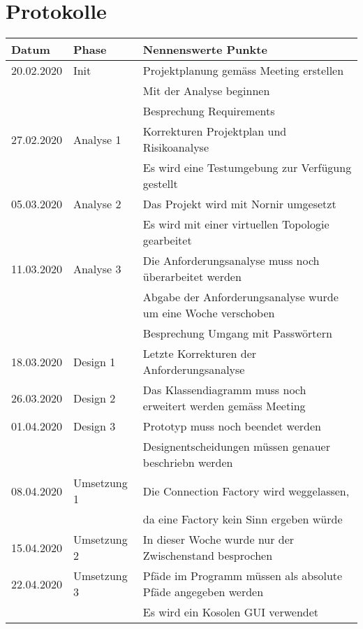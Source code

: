\documentclass[]{subfiles}
\begin{document}
\section{Protokolle}
    \begin{tabularx}{\linewidth}{lll}
        \toprule
        Datum & Phase & Nennenswerte Punkte \\
        \midrule
        20.02.2020 & Init & Projektplanung gemäss Meeting erstellen \\
        & & Mit der Analyse beginnen \\
        & & Besprechung Requirements \\
        \midrule
        27.02.2020 & Analyse 1 & Korrekturen Projektplan und Risikoanalyse \\
        & & Es wird eine Testumgebung zur Verfügung gestellt \\
        \midrule
        05.03.2020 & Analyse 2 & Das Projekt wird mit Nornir umgesetzt \\
        & & Es wird mit einer virtuellen Topologie gearbeitet\\
        \midrule
        11.03.2020 & Analyse 3 & Die Anforderungsanalyse muss noch überarbeitet werden \\
        & & Abgabe der Anforderungsanalyse wurde um eine Woche verschoben \\
        & & Besprechung Umgang mit Passwörtern \\
        \midrule
        18.03.2020 & Design 1 & Letzte Korrekturen der Anforderungsanalyse \\
        \midrule
        26.03.2020 & Design 2 & Das Klassendiagramm muss noch erweitert werden gemäss Meeting \\
        \midrule
        01.04.2020 & Design 3 & Prototyp muss noch beendet werden \\
        & & Designentscheidungen müssen genauer beschriebn werden \\
        \midrule
        08.04.2020 & Umsetzung 1 & Die Connection Factory wird weggelassen,\\
        & & da eine Factory kein Sinn ergeben würde \\
        \midrule
        15.04.2020 & Umsetzung 2 & In dieser Woche wurde nur der Zwischenstand besprochen \\
        \midrule
        22.04.2020 & Umsetzung 3 & Pfäde im Programm müssen als absolute Pfäde angegeben werden \\
        & & Es wird ein Kosolen GUI verwendet \\

\end{tabularx}
\end{document}
